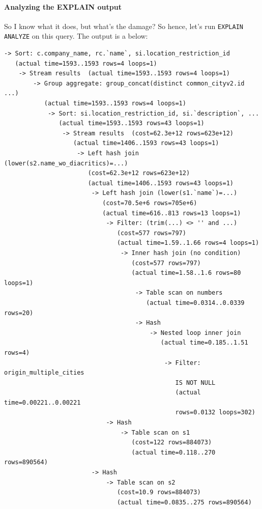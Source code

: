 \paragraph{Analyzing the EXPLAIN output}

So I know what it does, but what's the damage? So hence, let's run \texttt{EXPLAIN ANALYZE} on this query. The output is a below:

\begin{verbatim}
-> Sort: c.company_name, rc.`name`, si.location_restriction_id
   (actual time=1593..1593 rows=4 loops=1)
    -> Stream results  (actual time=1593..1593 rows=4 loops=1)
        -> Group aggregate: group_concat(distinct common_cityv2.id ...)
           (actual time=1593..1593 rows=4 loops=1)
            -> Sort: si.location_restriction_id, si.`description`, ...
               (actual time=1593..1593 rows=43 loops=1)
                -> Stream results  (cost=62.3e+12 rows=623e+12)
                   (actual time=1406..1593 rows=43 loops=1)
                    -> Left hash join (lower(s2.name_wo_diacritics)=...)
                       (cost=62.3e+12 rows=623e+12)
                       (actual time=1406..1593 rows=43 loops=1)
                        -> Left hash join (lower(s1.`name`)=...)
                           (cost=70.5e+6 rows=705e+6)
                           (actual time=616..813 rows=13 loops=1)
                            -> Filter: (trim(...) <> '' and ...)
                               (cost=577 rows=797)
                               (actual time=1.59..1.66 rows=4 loops=1)
                                -> Inner hash join (no condition)
                                   (cost=577 rows=797)
                                   (actual time=1.58..1.6 rows=80 loops=1)
                                    -> Table scan on numbers
                                       (actual time=0.0314..0.0339 rows=20)
                                    -> Hash
                                        -> Nested loop inner join
                                           (actual time=0.185..1.51 rows=4)
                                            -> Filter: origin_multiple_cities
                                               IS NOT NULL
                                               (actual time=0.00221..0.00221
                                               rows=0.0132 loops=302)
                            -> Hash
                                -> Table scan on s1
                                   (cost=122 rows=884073)
                                   (actual time=0.118..270 rows=890564)
                        -> Hash
                            -> Table scan on s2
                               (cost=10.9 rows=884073)
                               (actual time=0.0835..275 rows=890564)
\end{verbatim}

